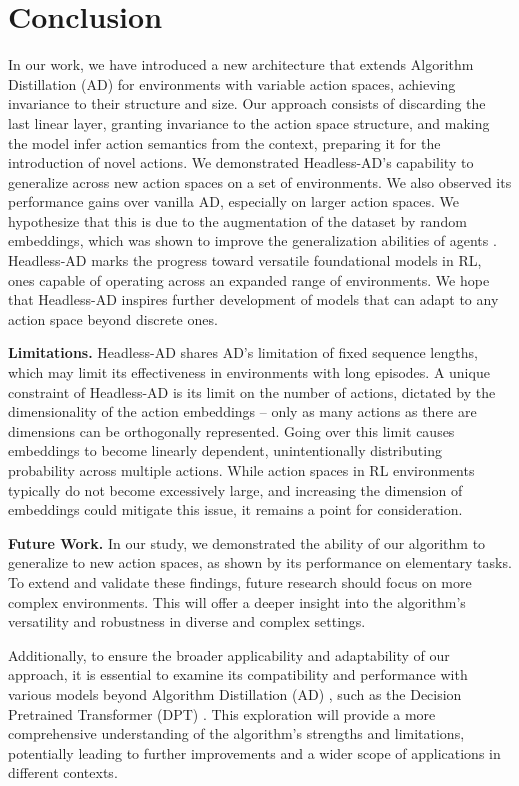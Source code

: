 \section{Conclusion}
In our work, we have introduced a new architecture that extends Algorithm Distillation (AD) for environments with variable action spaces, achieving invariance to their structure and size. Our approach consists of discarding the last linear layer, granting invariance to the action space structure, and making the model infer action semantics from the context, preparing it for the introduction of novel actions. We demonstrated Headless-AD's capability to generalize across new action spaces on a set of environments. We also observed its performance gains over vanilla AD, especially on larger action spaces. We hypothesize that this is due to the augmentation of the dataset by random embeddings, which was shown to improve the generalization abilities of agents \cite{kirsch2023towards}. Headless-AD marks the progress toward versatile foundational models in RL, ones capable of operating across an expanded range of environments. We hope that Headless-AD inspires further development of models that can adapt to any action space beyond discrete ones.

\textbf{Limitations.} Headless-AD shares AD's limitation of fixed sequence lengths, which may limit its effectiveness in environments with long episodes. A unique constraint of Headless-AD is its limit on the number of actions, dictated by the dimensionality of the action embeddings -- only as many actions as there are dimensions can be orthogonally represented. Going over this limit causes embeddings to become linearly dependent, unintentionally distributing probability across multiple actions. While action spaces in RL environments typically do not become excessively large, and increasing the dimension of embeddings could mitigate this issue, it remains a point for consideration.

\textbf{Future Work.} In our study, we demonstrated the ability of our algorithm to generalize to new action spaces, as shown by its performance on elementary tasks. To extend and validate these findings, future research should focus on more complex environments. This will offer a deeper insight into the algorithm's versatility and robustness in diverse and complex settings.

Additionally, to ensure the broader applicability and adaptability of our approach, it is essential to examine its compatibility and performance with various models beyond Algorithm Distillation (AD) \citep{laskin2022context}, such as the Decision Pretrained Transformer (DPT) \citep{lee2023supervised}. This exploration will provide a more comprehensive understanding of the algorithm's strengths and limitations, potentially leading to further improvements and a wider scope of applications in different contexts. 